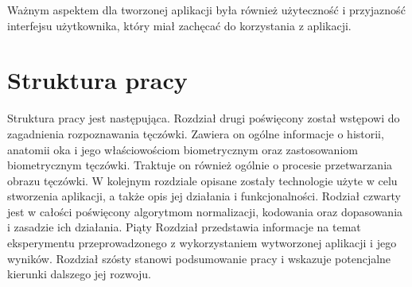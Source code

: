 \noindent
Ważnym aspektem dla tworzonej aplikacji była również użyteczność i przyjazność interfejsu użytkownika,
który miał zachęcać do korzystania z aplikacji.

\section{Struktura pracy}

Struktura pracy jest następująca. Rozdział drugi poświęcony został wstępowi do zagadnienia
rozpoznawania tęczówki. Zawiera on ogólne informacje o historii, anatomii oka i jego właściowościom
biometrycznym oraz zastosowaniom biometrycznym tęczówki. Traktuje on również ogólnie o procesie
przetwarzania obrazu tęczówki. W kolejnym rozdziale opisane zostały technologie użyte w celu stworzenia
aplikacji, a także opis jej działania i funkcjonalności. Rodział czwarty jest w całości poświęcony
algorytmom normalizacji, kodowania oraz dopasowania i zasadzie ich działania. Piąty Rozdział
przedstawia informacje na temat eksperymentu przeprowadzonego z wykorzystaniem wytworzonej
aplikacji i jego wyników. Rozdział szósty stanowi podsumowanie pracy i wskazuje potencjalne
kierunki dalszego jej rozwoju.

